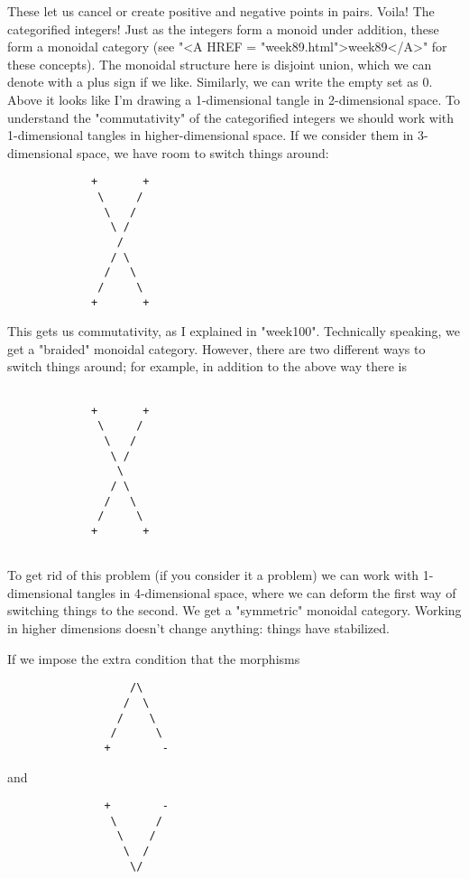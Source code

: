 These let us cancel or create positive and negative points in pairs.
Voila!  The categorified integers!  Just as the integers form a monoid
under addition, these form a monoidal category (see "<A HREF = "week89.html">week89</A>" for these
concepts).  The monoidal structure here is disjoint union, which we can
denote with a plus sign if we like.  Similarly, we can write the empty 
set as 0.  
Above it looks like I'm drawing a 1-dimensional tangle in 2-dimensional
space.  To understand the "commutativity" of the categorified integers
we should work with 1-dimensional tangles in higher-dimensional space.
If we consider them in 3-dimensional space, we have room to switch
things around:
\begin{verbatim}
             +       +
              \     /
               \   /
                \ /
                 /
                / \
               /   \
              /     \
             +       +
\end{verbatim}
    
This gets us commutativity, as I explained in "week100".  Technically
speaking, we get a "braided" monoidal category.  However, there are two
different ways to switch things around; for example, in addition to the
above way there is 
\begin{verbatim}

             +       +
              \     /
               \   /
                \ /
                 \
                / \
               /   \
              /     \
             +       +
 
\end{verbatim}
    
To get rid of this problem (if you consider it a problem) we can work
with 1-dimensional tangles in 4-dimensional space, where we can deform
the first way of switching things to the second.  We get a "symmetric"
monoidal category.  Working in higher dimensions doesn't change
anything: things have stabilized.

If we impose the extra condition that the morphisms

\begin{verbatim}
                   /\
                  /  \
                 /    \
                /      \
               +        -

\end{verbatim}
    
and 
\begin{verbatim}
               +        -
                \      /
                 \    /
                  \  / 
                   \/
                    
\end{verbatim}
    
